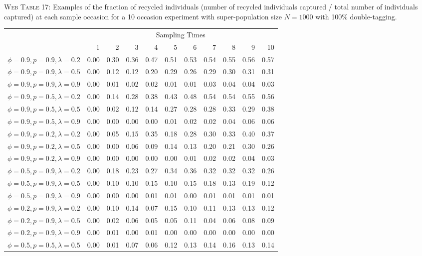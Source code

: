 \documentclass[]{article}
\begin{document}
\textsc{Web Table 17:} Examples of the fraction of recycled individuals
(number of recycled individuals captured / total number of individuals
captured) at each sample occasion for a 10 occasion experiment with
super-population size \(N=1000\) with 100\% double-tagging.

\begin{table}[ht]
\begin{tabular}{rrrrrrrrrrr}
  \hline
& \multicolumn{10}{c}{Sampling Times}\\
 & 1 & 2 & 3 & 4 & 5 & 6 & 7 & 8 & 9 & 10 \\ 
  \hline
  $\phi=0.9, p=0.9, \lambda=0.2$ & 0.00 & 0.30 & 0.36 & 0.47 & 0.51 & 0.53 & 0.54 & 0.55 & 0.56 & 0.57 \\ 
  $\phi=0.9, p=0.9, \lambda=0.5$ & 0.00 & 0.12 & 0.12 & 0.20 & 0.29 & 0.26 & 0.29 & 0.30 & 0.31 & 0.31 \\ 
  $\phi=0.9, p=0.9, \lambda=0.9$ & 0.00 & 0.01 & 0.02 & 0.02 & 0.01 & 0.01 & 0.03 & 0.04 & 0.04 & 0.03 \\ \hline
  $\phi=0.9, p=0.5, \lambda=0.2$ & 0.00 & 0.14 & 0.28 & 0.38 & 0.43 & 0.48 & 0.54 & 0.54 & 0.55 & 0.56 \\ 
  $\phi=0.9, p=0.5, \lambda=0.5$ & 0.00 & 0.02 & 0.12 & 0.14 & 0.27 & 0.28 & 0.28 & 0.33 & 0.29 & 0.38 \\ 
  $\phi=0.9, p=0.5, \lambda=0.9$ & 0.00 & 0.00 & 0.00 & 0.00 & 0.01 & 0.02 & 0.02 & 0.04 & 0.06 & 0.06 \\ \hline
  $\phi=0.9, p=0.2, \lambda=0.2$ & 0.00 & 0.05 & 0.15 & 0.35 & 0.18 & 0.28 & 0.30 & 0.33 & 0.40 & 0.37 \\ 
  $\phi=0.9, p=0.2, \lambda=0.5$ & 0.00 & 0.00 & 0.06 & 0.09 & 0.14 & 0.13 & 0.20 & 0.21 & 0.30 & 0.26 \\ 
  $\phi=0.9, p=0.2, \lambda=0.9$ & 0.00 & 0.00 & 0.00 & 0.00 & 0.00 & 0.01 & 0.02 & 0.02 & 0.04 & 0.03 \\ \hline
  $\phi=0.5, p=0.9, \lambda=0.2$ & 0.00 & 0.18 & 0.23 & 0.27 & 0.34 & 0.36 & 0.32 & 0.32 & 0.32 & 0.26 \\ 
  $\phi=0.5, p=0.9, \lambda=0.5$ & 0.00 & 0.10 & 0.10 & 0.15 & 0.10 & 0.15 & 0.18 & 0.13 & 0.19 & 0.12 \\ 
  $\phi=0.5, p=0.9, \lambda=0.9$ & 0.00 & 0.00 & 0.00 & 0.01 & 0.01 & 0.00 & 0.01 & 0.01 & 0.01 & 0.01 \\ \hline
  $\phi=0.2, p=0.9, \lambda=0.2$ & 0.00 & 0.10 & 0.14 & 0.07 & 0.15 & 0.10 & 0.11 & 0.13 & 0.13 & 0.12 \\ 
  $\phi=0.2, p=0.9, \lambda=0.5$ & 0.00 & 0.02 & 0.06 & 0.05 & 0.05 & 0.11 & 0.04 & 0.06 & 0.08 & 0.09 \\ 
  $\phi=0.2, p=0.9, \lambda=0.9$ & 0.00 & 0.01 & 0.00 & 0.01 & 0.00 & 0.00 & 0.00 & 0.00 & 0.00 & 0.00 \\ \hline
    $\phi=0.5, p=0.5, \lambda=0.5$ & 0.00 & 0.01 & 0.07 & 0.06 & 0.12 & 0.13 & 0.14 & 0.16 & 0.13 & 0.14 \\ \hline
\end{tabular}
\end{table}
\end{document}
